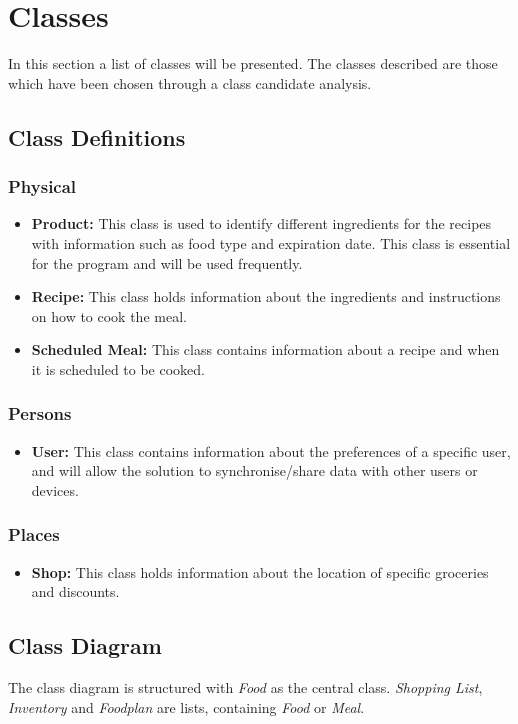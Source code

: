 \section{Classes}\label{ClassesLabel}
In this section a list of classes will be presented. The classes described are those which have been chosen through a class candidate analysis.

\subsection{Class Definitions}

\subsubsection{Physical}
\begin{itemize}
\item \textbf{Product:} This class is used to identify different ingredients for the recipes with information such as food type and expiration date. This class is essential for the program and will be used frequently.
\item \textbf{Recipe:} This class holds information about the ingredients and instructions on how to cook the meal.
\item \textbf{Scheduled Meal:} This class contains information about a recipe and when it is scheduled to be cooked.
\end{itemize}

\subsubsection{Persons}
\begin{itemize}
\item \textbf{User:} This class contains information about the preferences of a specific user, and will allow the solution to synchronise/share data with other users or devices.
\end{itemize}

\subsubsection{Places}
\begin{itemize}
\item \textbf{Shop:} This class holds information about the location of specific groceries and discounts.
\end{itemize}

\subsection{Class Diagram}
The class diagram is structured with \textit{Food} as the central class. 
\textit{Shopping List}, \textit{Inventory} and \textit{Foodplan} are lists, containing \textit{Food} or \textit{Meal}.

